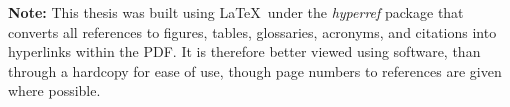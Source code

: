 \documentclass[11pt]{report} %
\begin{document}
\begin{spacing}{1.1}





{\noindent \textbf{Note:} This thesis was built using \LaTeX\  under the \textit{hyperref} package that converts all references to figures, tables, glossaries, acronyms, and citations into hyperlinks within the PDF. It is therefore better viewed using software, than through a hardcopy for ease of use, though page numbers to references are given where possible.}


\begin{spacing}{1.2}

\end{spacing}

\pagebreak
\tableofcontents
\end{spacing}

\endgroup





\pagebreak







\begin{spacing}{1}


\pagebreak
\printglossary[type=biol]
\pagebreak
\printglossary[type=comp]

\end{spacing}
\appendix

\end{document}
